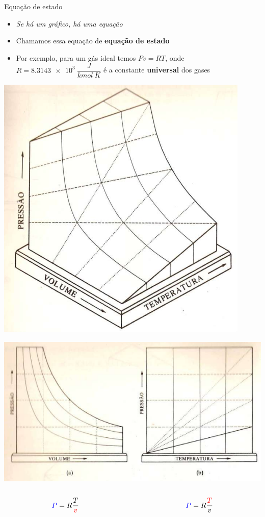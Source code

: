 \documentclass[t,%
brazilian,%
11pt,%
aspectratio=169,%
table%
]{beamer}
\begin{document}
\begin{frame}{Equação de estado}
    \begin{itemize}
        \item \textit{Se há um gráfico, há uma equação }
        \item Chamamos essa equação de \textbf{equação de estado}
        \item Por exemplo, para um gás ideal temos \( Pv = RT \), onde 
            \(R=\SI{8.3143e3}{\dfrac{J}{kmol~K}}\) é a constante \textbf{universal} dos gases 
    \end{itemize}
    \centering
    \includegraphics[height=7.5cm-64pt]{images/pvt-ideal.png}
\end{frame}

\begin{frame}
    \centering
    \includegraphics[height=0.8\textheight]{images/Captura de tela de 2023-04-03 13-42-22.png}
    \begin{columns}
        \begin{column}{0.4\textwidth}
            \[
                \textcolor{blue}{P}=R\frac{T}{\textcolor{red}{v}}
            \]
        \end{column}

        \begin{column}{0.4\textwidth}
            \[
                \textcolor{blue}{P}=R\frac{\textcolor{red}{T}}{v}
            \]
        \end{column}
    \end{columns}
\end{frame}
\end{document}
